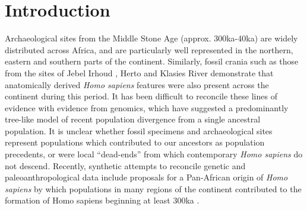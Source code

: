 \documentclass[]{article}
\begin{document}
\section*{Introduction}

Archaeological sites from the Middle Stone Age (approx. 300ka-40ka) are widely
distributed across Africa, and are particularly well represented in the
northern, eastern and southern parts of the continent. Similarly, fossil crania
such as those from the sites of Jebel Irhoud \citep{Hublin2017-cq}, Herto
\citep{White2003-bk} and Klasies River \citep{Deacon1995-rx} demonstrate that
anatomically derived \emph{Homo sapiens} features were also present across the
continent during this period. It has been difficult to reconcile these lines of
evidence with evidence from genomics, which have suggested a predominantly
tree-like model of recent population divergence from a single ancestral
population. It is unclear whether fossil specimens and archaeological sites
represent populations which contributed to our ancestors as population
precedents, or were local “dead-ends” from which contemporary \emph{Homo
sapiens} do not descend. Recently, synthetic attempts to reconcile genetic and
paleoanthropological data include proposals for a Pan-African origin of
\emph{Homo sapiens} by which populations in many regions of the continent
contributed to the formation of Homo sapiens beginning at least 300ka
\citep{Stringer2016-mj,Scerri2018-nl,Scerri2019-xg}.
\end{document}
